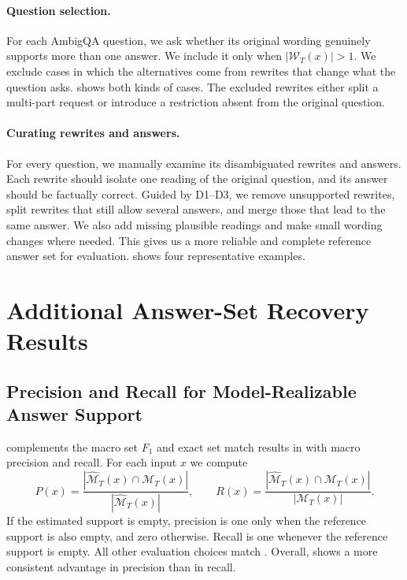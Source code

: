 \paragraph{Question selection.}
For each AmbigQA question, we ask whether its original wording genuinely supports more than one answer. We include it only when \(\lvert\mathcal{W}_T(x)\rvert>1\). We exclude cases in which the alternatives come from rewrites that change what the question asks.  shows both kinds of cases. The excluded rewrites either split a multi-part request or introduce a restriction absent from the original question.



\paragraph{Curating rewrites and answers.}
For every question, we manually examine its disambiguated rewrites and answers. Each rewrite should isolate one reading of the original question, and its answer should be factually correct. Guided by D1--D3, we remove unsupported rewrites, split rewrites that still allow several answers, and merge those that lead to the same answer. We also add missing plausible readings and make small wording changes where needed. This gives us a more reliable and complete reference answer set for evaluation.  shows four representative examples.



\FloatBarrier

\section{Additional Answer-Set Recovery Results}
\label{app:additional-set-recovery}

\subsection{Precision and Recall for Model-Realizable Answer Support}
\label{app:full-precision-recall}

 complements the macro set $F_1$ and exact set match results in  with macro precision and recall. For each input $x$ we compute
\[
P(x)=\frac{\left|\widehat{\mathcal{M}}_T(x)\cap\mathcal{M}_T(x)\right|}{\left|\widehat{\mathcal{M}}_T(x)\right|},
\qquad
R(x)=\frac{\left|\widehat{\mathcal{M}}_T(x)\cap\mathcal{M}_T(x)\right|}{\left|\mathcal{M}_T(x)\right|}.
\]
If the estimated support is empty, precision is one only when the reference support is also empty, and zero otherwise. Recall is one whenever the reference support is empty. All other evaluation choices match . Overall, \circleclar{} shows a more consistent advantage in precision than in recall.

